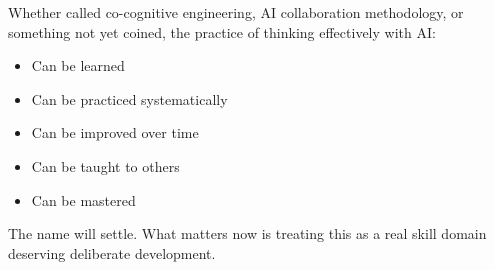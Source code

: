Whether called co-cognitive engineering, AI collaboration methodology, or something not yet coined, the practice of thinking effectively with AI:

\begin{itemize}
    \item Can be learned
    \item Can be practiced systematically
    \item Can be improved over time
    \item Can be taught to others
    \item Can be mastered
\end{itemize}

The name will settle. What matters now is treating this as a real skill domain deserving deliberate development.

